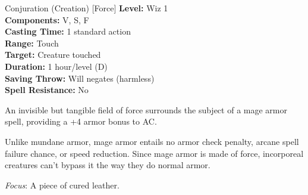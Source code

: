 {Conjuration (Creation) [Force]}
{
	\textbf{Level:}
	Wiz 1\\
	\textbf{Components:}
	V, S, F\\
	\textbf{Casting Time:}
	1 standard action\\
	\textbf{Range:}
	Touch\\
	\textbf{Target:}
	Creature touched\\
	\textbf{Duration:}
	1 hour/level (D)\\
	\textbf{Saving Throw:}
	Will negates (harmless)\\
	\textbf{Spell Resistance:}
	No\\
}
{
	An invisible but tangible field of force surrounds the subject of a mage armor spell, providing a +4 armor bonus to AC.

	Unlike mundane armor, mage armor entails no armor check penalty, arcane spell failure chance, or speed reduction. Since mage armor is made of force, incorporeal creatures can't bypass it the way they do normal armor.

	\textit{Focus}:
	A piece of cured leather.

}

